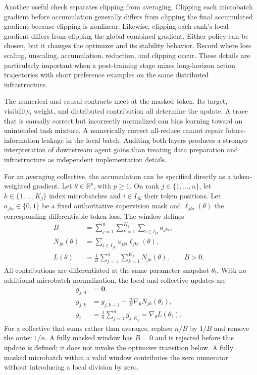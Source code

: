 Another useful check separates clipping from averaging. Clipping each microbatch gradient before accumulation generally differs from clipping the final accumulated gradient because clipping is nonlinear. Likewise, clipping each rank's local gradient differs from clipping the global combined gradient. Either policy can be chosen, but it changes the optimizer and its stability behavior. Record where loss scaling, unscaling, accumulation, reduction, and clipping occur. These details are particularly important when a post-training stage mixes long-horizon action trajectories with short preference examples on the same distributed infrastructure.

The numerical and causal contracts meet at the masked token. Its target, visibility, weight, and distributed contribution all determine the update. A trace that is causally correct but incorrectly normalized can bias learning toward an unintended task mixture. A numerically correct all-reduce cannot repair future-information leakage in the local batch. Auditing both layers produces a stronger interpretation of downstream agent gains than treating data preparation and infrastructure as independent implementation details.

For an averaging collective, the accumulation can be specified directly as a token-weighted gradient. Let $\theta\in\mathbb R^p$, with $p\geq1$. On rank $j\in\{1,\ldots,n\}$, let $k\in\{1,\ldots,K_j\}$ index microbatches and $i\in I_{jk}$ their token positions. Let $a_{jki}\in\{0,1\}$ be a fixed authoritative supervision mask and $\ell_{jki}(\theta)$ the corresponding differentiable token loss. The window defines
\begin{equation}
\label{eq:C07:masked-window}
\begin{aligned}
 B&=\sum_{j=1}^{n}\sum_{k=1}^{K_j}\sum_{i\in I_{jk}}a_{jki},\\
 N_{jk}(\theta)&=\sum_{i\in I_{jk}}a_{jki}\ell_{jki}(\theta),\\
 L(\theta)&=\frac1B\sum_{j=1}^{n}\sum_{k=1}^{K_j}N_{jk}(\theta),
 \qquad B>0.
\end{aligned}
\end{equation}
All contributions are differentiated at the same parameter snapshot $\theta_t$. With no additional microbatch normalization, the local and collective updates are
\begin{equation}
\label{eq:C07:global-gradient}
\begin{aligned}
 g_{j,0}&=\mathbf0,\\
 g_{j,k}&=g_{j,k-1}+\frac nB\nabla_\theta N_{jk}(\theta_t),\\
 g_t&=\frac1n\sum_{j=1}^{n}g_{j,K_j}
     =\nabla_\theta L(\theta_t).
\end{aligned}
\end{equation}
For a collective that sums rather than averages, replace $n/B$ by $1/B$ and remove the outer $1/n$. A fully masked window has $B=0$ and is rejected before this update is defined; it does not invoke the optimizer transition below. A fully masked microbatch within a valid window contributes the zero numerator without introducing a local division by zero.

